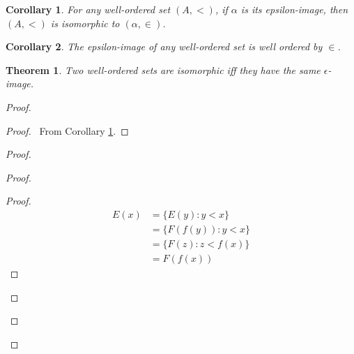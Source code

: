 \documentclass{article}
\let\qed\relax
\newtheorem{theorem}[axiom]{Theorem}
\newtheorem{corollary}{Corollary}[axiom]
\theoremstyle{definition}
\begin{document}
    \begin{corollary}
        \label{corollary:isomorphic_to_epsilon_image}
        For any well-ordered set $(A, <)$, if $\alpha$ is its epsilon-image, then
        $(A, <)$ is isomorphic to $(\alpha, \in)$.
    \end{corollary}

    \begin{corollary}
        \label{corollary:epsilon_image_well_ordered}
        The epsilon-image of any well-ordered set is well ordered by $\in$.
    \end{corollary}

    \begin{theorem}
        Two well-ordered sets are isomorphic iff they have the same $\epsilon$-image.
    \end{theorem}

    \begin{proof}
        \pf
        \begin{proof}
            \pf\ From Corollary \ref{corollary:isomorphic_to_epsilon_image}.
        \end{proof}
        \begin{proof}
            \begin{proof}
                \begin{proof}
                    \pf
                    \begin{align*}
                        E(x) & = \{ E(y) : y < x \} \\
                        & = \{ F(f(y)) : y < x \} \\
                        & = \{ F(z) : z < f(x) \} \\
                        & = F(f(x))
                    \end{align*}
                \end{proof}
            \end{proof}
        \end{proof}
        \qed
    \end{proof}
\end{document}
